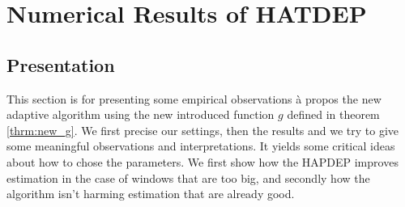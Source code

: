 \documentclass[11pt]{book}
\begin{document}
\frontmatter
\pagestyle{front}


\newpage




\thispagestyle{empty}%

                                                                







\mainmatter
\pagestyle{main}












\chapter{Numerical Results of HATDEP}

\section{Presentation}
This section is for presenting some empirical observations à propos the new adaptive algorithm using the new introduced function $g$ defined in theorem \ref{thrm:new_g}. We first precise our settings, then the results and we try to give some meaningful observations and interpretations. It yields some critical ideas about how to chose the parameters. We first show how the HAPDEP improves estimation in the case of windows that are too big, and secondly how the algorithm isn't harming estimation that are already good.
\end{document}
